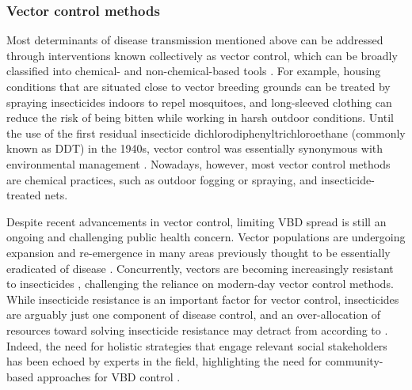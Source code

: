

\subsubsection{Vector control methods}

Most determinants of disease transmission mentioned above can be addressed through interventions known collectively as vector control, which can be broadly classified into chemical- and non-chemical-based tools \cite{wilson_importance_2020}. For example, housing conditions that are situated close to vector breeding grounds can be treated by spraying insecticides indoors to repel mosquitoes, and long-sleeved clothing can reduce the risk of being bitten while working in harsh outdoor conditions. Until the use of the first residual insecticide dichlorodiphenyltrichloroethane (commonly known as DDT) in the 1940s, vector control was essentially synonymous with environmental management \cite{wilson_importance_2020}. Nowadays, however, most vector control methods are chemical practices, such as outdoor fogging or spraying, and insecticide-treated nets.

Despite recent advancements in vector control, limiting VBD spread is still an ongoing and challenging public health concern. Vector populations are undergoing expansion and re-emergence in many areas previously thought to be essentially eradicated of disease \cite{atkinson_global_2010}. Concurrently, vectors are becoming increasingly resistant to insecticides \cite{degroote_interventions_2018, hemingway_averting_2016}, challenging the reliance on modern-day vector control methods. While insecticide resistance is an important factor for vector control, insecticides are arguably just one component of disease control, and an over-allocation of resources toward solving insecticide resistance may detract from  according to \citet{okumu_what_2022}. Indeed, the need for holistic strategies that engage relevant social stakeholders has been echoed by experts in the field, highlighting the need for community-based approaches for VBD control \cite{bardosh_addressing_2017}.

